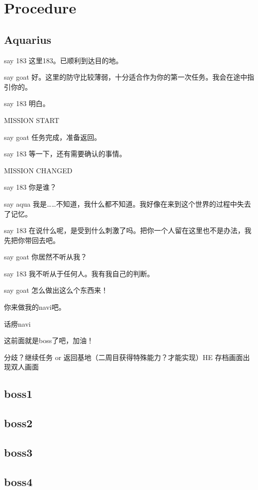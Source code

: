 \documentclass{article}
\begin{document}
\section{Procedure}



\subsection{Aquarius}

say 183 这里183。已顺利到达目的地。

say goat 好。这里的防守比较薄弱，十分适合作为你的第一次任务。我会在途中指引你的。

say 183 明白。

MISSION START

say goat 任务完成，准备返回。

say 183 等一下，还有需要确认的事情。

MISSION CHANGED

say 183 你是谁？

say aqua 我是……不知道，我什么都不知道。我好像在来到这个世界的过程中失去了记忆。

say 183 在说什么呢，是受到什么刺激了吗。把你一个人留在这里也不是办法，我先把你带回去吧。

say goat 你居然不听从我？

say 183 我不听从于任何人。我有我自己的判断。

say goat 怎么做出这么个东西来！

你来做我的navi吧。

话痨navi

这前面就是boss了吧，加油！

分歧？继续任务 or 返回基地（二周目获得特殊能力？才能实现）HE 存档画面出现双人画面

\subsection{boss1}

\subsection{boss2}

\subsection{boss3}

\subsection{boss4}
\end{document}
